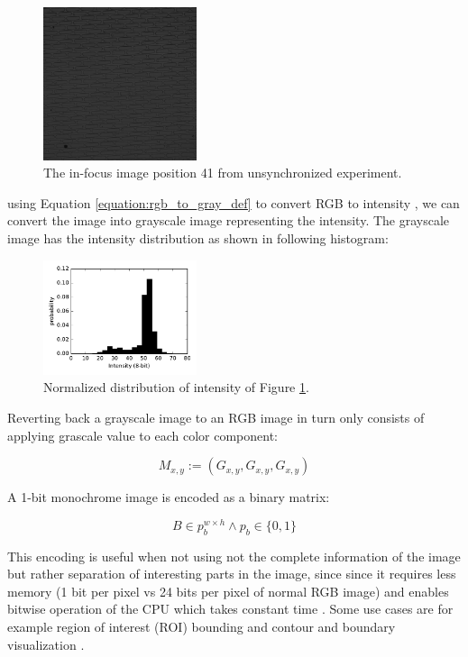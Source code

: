 \documentclass[pdftex,12pt,a4paper]{report}
\begin{document}
\begin{figure}[H]
\centering
\includegraphics[width=0.4\textwidth]{images/pos_41_in_t0}
\caption{The in-focus image position 41 from unsynchronized experiment.}
\label{fig:pos41}
\end{figure}

using Equation \ref{equation:rgb_to_gray_def} to convert RGB to intensity , we can convert the image into grayscale image representing the intensity. The grayscale image has the intensity distribution as shown in following histogram:

\begin{figure}[H]
\centering
\includegraphics[width=0.4\textwidth]{images/pos_41_in_t0_hist}
\caption{Normalized distribution of intensity of Figure \ref{fig:pos41}.}
\label{fig:pos41_density}
\end{figure}

Reverting back a grayscale image to an RGB image in turn only consists of applying grascale value to each color component:

$$
M_{x, y} := (G_{x, y}, G_{x, y}, G_{x, y})
$$

A 1-bit monochrome image is encoded as a binary matrix:

$$
B \in p_b^{w \times h} \land p_b \in \{0, 1\}
$$

This encoding is useful when not using not the complete information of the image but rather separation of interesting parts in the image, since since it requires less memory (1 bit per pixel vs 24 bits per pixel of normal RGB image) and enables bitwise operation of the CPU which takes constant time \cite{kernighan1988c}.  Some use cases are for example region of interest (ROI) bounding and contour and boundary visualization \cite{hartley2003multiple}.
\end{document}
